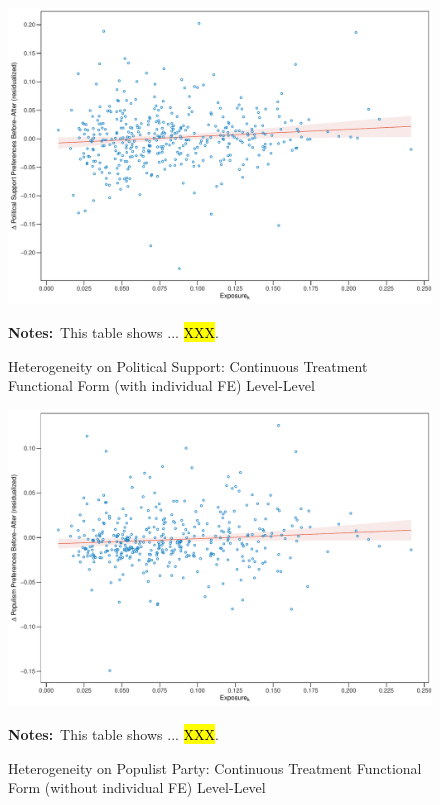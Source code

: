 \documentclass[11pt]{article}
\begin{document}
\begin{figure}[htbp!]
    \centering
    \caption{Heterogeneity on Political Support: Continuous Treatment Functional Form (with individual FE) Level-Level}\label{fig:ps_functional_form_cbk_past_mean_ife_levels}
    \includegraphics[width=1\linewidth]{heterogeneity/ps_functional_form_cbk_past_mean_ife_levels}
    \begin{tablenotes}
        \footnotesize
        \item \textbf{Notes:}~This table shows ... \hl{XXX}.
    \end{tablenotes} 
\end{figure}

\begin{figure}[htbp!]
    \centering
    \caption{Heterogeneity on Populist Party: Continuous Treatment Functional Form (without individual FE) Level-Level}\label{fig:pp_functional_form_cbk_past_mean_noife_levels}
    \includegraphics[width=1\linewidth]{heterogeneity/pp_functional_form_cbk_past_mean_noife_levels}
    \begin{tablenotes}
        \footnotesize
        \item \textbf{Notes:}~This table shows ... \hl{XXX}.
    \end{tablenotes} 
\end{figure}
\end{document}
